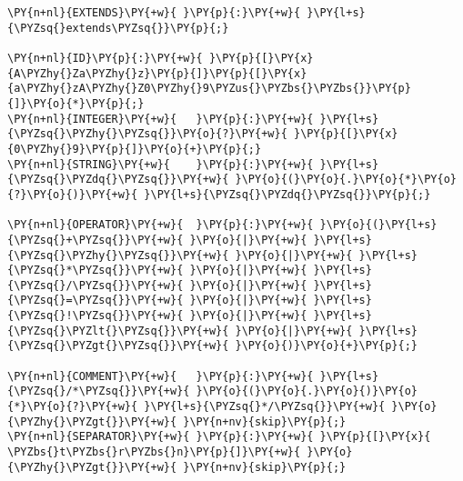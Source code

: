 \begin{Verbatim}[commandchars=\\\{\}]
\PY{n+nl}{EXTENDS}\PY{+w}{ }\PY{p}{:}\PY{+w}{ }\PY{l+s}{\PYZsq{}extends\PYZsq{}}\PY{p}{;}

\PY{n+nl}{ID}\PY{p}{:}\PY{+w}{ }\PY{p}{[}\PY{x}{A\PYZhy{}Za\PYZhy{}z}\PY{p}{]}\PY{p}{[}\PY{x}{a\PYZhy{}zA\PYZhy{}Z0\PYZhy{}9\PYZus{}\PYZbs{}\PYZbs{}}\PY{p}{]}\PY{o}{*}\PY{p}{;}
\PY{n+nl}{INTEGER}\PY{+w}{   }\PY{p}{:}\PY{+w}{ }\PY{l+s}{\PYZsq{}\PYZhy{}\PYZsq{}}\PY{o}{?}\PY{+w}{ }\PY{p}{[}\PY{x}{0\PYZhy{}9}\PY{p}{]}\PY{o}{+}\PY{p}{;}
\PY{n+nl}{STRING}\PY{+w}{    }\PY{p}{:}\PY{+w}{ }\PY{l+s}{\PYZsq{}\PYZdq{}\PYZsq{}}\PY{+w}{ }\PY{o}{(}\PY{o}{.}\PY{o}{*}\PY{o}{?}\PY{o}{)}\PY{+w}{ }\PY{l+s}{\PYZsq{}\PYZdq{}\PYZsq{}}\PY{p}{;}

\PY{n+nl}{OPERATOR}\PY{+w}{  }\PY{p}{:}\PY{+w}{ }\PY{o}{(}\PY{l+s}{\PYZsq{}+\PYZsq{}}\PY{+w}{ }\PY{o}{|}\PY{+w}{ }\PY{l+s}{\PYZsq{}\PYZhy{}\PYZsq{}}\PY{+w}{ }\PY{o}{|}\PY{+w}{ }\PY{l+s}{\PYZsq{}*\PYZsq{}}\PY{+w}{ }\PY{o}{|}\PY{+w}{ }\PY{l+s}{\PYZsq{}/\PYZsq{}}\PY{+w}{ }\PY{o}{|}\PY{+w}{ }\PY{l+s}{\PYZsq{}=\PYZsq{}}\PY{+w}{ }\PY{o}{|}\PY{+w}{ }\PY{l+s}{\PYZsq{}!\PYZsq{}}\PY{+w}{ }\PY{o}{|}\PY{+w}{ }\PY{l+s}{\PYZsq{}\PYZlt{}\PYZsq{}}\PY{+w}{ }\PY{o}{|}\PY{+w}{ }\PY{l+s}{\PYZsq{}\PYZgt{}\PYZsq{}}\PY{+w}{ }\PY{o}{)}\PY{o}{+}\PY{p}{;}

\PY{n+nl}{COMMENT}\PY{+w}{   }\PY{p}{:}\PY{+w}{ }\PY{l+s}{\PYZsq{}/*\PYZsq{}}\PY{+w}{ }\PY{o}{(}\PY{o}{.}\PY{o}{)}\PY{o}{*}\PY{o}{?}\PY{+w}{ }\PY{l+s}{\PYZsq{}*/\PYZsq{}}\PY{+w}{ }\PY{o}{\PYZhy{}\PYZgt{}}\PY{+w}{ }\PY{n+nv}{skip}\PY{p}{;}
\PY{n+nl}{SEPARATOR}\PY{+w}{ }\PY{p}{:}\PY{+w}{ }\PY{p}{[}\PY{x}{ \PYZbs{}t\PYZbs{}r\PYZbs{}n}\PY{p}{]}\PY{+w}{ }\PY{o}{\PYZhy{}\PYZgt{}}\PY{+w}{ }\PY{n+nv}{skip}\PY{p}{;}
\end{Verbatim}
